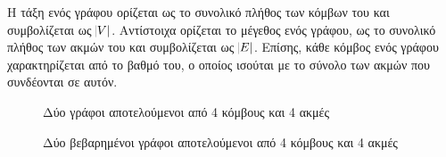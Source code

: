 \documentclass[12pt,twoside]{article}
\begin{document}
Η τάξη ενός γράφου ορίζεται ως το συνολικό πλήθος των κόμβων του και συμβολίζεται ως $\abs{V}$. Αντίστοιχα ορίζεται το μέγεθος ενός γράφου, ως το συνολικό πλήθος των ακμών του και συμβολίζεται ως $\abs{E}$. Επίσης, κάθε κόμβος ενός γράφου χαρακτηρίζεται από το βαθμό του, ο οποίος ισούται με το σύνολο των ακμών που συνδέονται σε αυτόν. 

\begin{figure}[!t]
\centering
{}
	\hfil
 \caption{Δύο γράφοι αποτελούμενοι από 4 κόμβους και 4 ακμές}
 \label{gr}
\end{figure}
\begin{figure}[!t]
\centering
{}
	\hfil
 \caption{Δύο βεβαρημένοι γράφοι αποτελούμενοι από 4 κόμβους και 4 ακμές}
 \label{gr2}
\end{figure}
\end{document}
